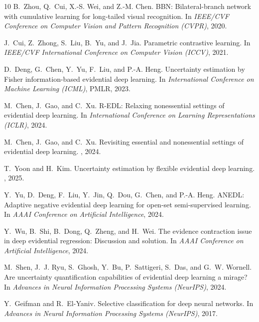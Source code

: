 \documentclass[letterpaper]{article} %
\begin{document}
\begin{thebibliography}{10}
B.~Zhou, Q.~Cui, X.-S. Wei, and Z.-M. Chen.
\newblock BBN: Bilateral-branch network with cumulative learning for long-tailed visual recognition.
\newblock In {\em IEEE/CVF Conference on Computer Vision and Pattern Recognition (CVPR)}, 2020.

J.~Cui, Z.~Zhong, S.~Liu, B.~Yu, and J.~Jia.
\newblock Parametric contrastive learning.
\newblock In {\em IEEE/CVF International Conference on Computer Vision (ICCV)}, 2021.

D.~Deng, G.~Chen, Y.~Yu, F.~Liu, and P.-A. Heng.
\newblock Uncertainty estimation by Fisher information-based evidential deep learning.
\newblock In {\em International Conference on Machine Learning (ICML)}, PMLR, 2023.

M.~Chen, J.~Gao, and C.~Xu.
\newblock R-EDL: Relaxing nonessential settings of evidential deep learning.
\newblock In {\em International Conference on Learning Representations (ICLR)}, 2024.

M.~Chen, J.~Gao, and C.~Xu.
\newblock Revisiting essential and nonessential settings of evidential deep learning.
, 2024.

T.~Yoon and H.~Kim.
\newblock Uncertainty estimation by flexible evidential deep learning.
, 2025.

Y.~Yu, D.~Deng, F.~Liu, Y.~Jin, Q.~Dou, G.~Chen, and P.-A. Heng.
\newblock ANEDL: Adaptive negative evidential deep learning for open-set semi-supervised learning.
\newblock In {\em AAAI Conference on Artificial Intelligence}, 2024.

Y.~Wu, B.~Shi, B.~Dong, Q.~Zheng, and H.~Wei.
\newblock The evidence contraction issue in deep evidential regression: Discussion and solution.
\newblock In {\em AAAI Conference on Artificial Intelligence}, 2024.

M.~Shen, J.~J. Ryu, S.~Ghosh, Y.~Bu, P.~Sattigeri, S.~Das, and G.~W. Wornell.
\newblock Are uncertainty quantification capabilities of evidential deep learning a mirage?
\newblock In {\em Advances in Neural Information Processing Systems (NeurIPS)}, 2024.

Y.~Geifman and R.~El-Yaniv.
\newblock Selective classification for deep neural networks.
\newblock In {\em Advances in Neural Information Processing Systems (NeurIPS)}, 2017.


\end{thebibliography}
\end{document}

